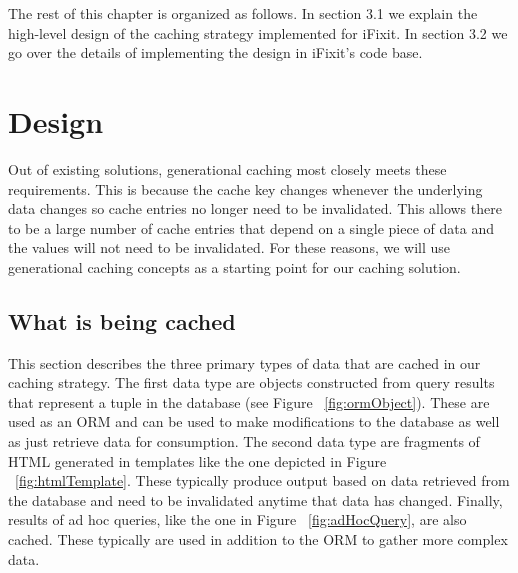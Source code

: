 \documentclass[12pt]{ucthesis}
\begin{document}
The rest of this chapter is organized as follows.
In section 3.1 we explain the high-level design of the caching strategy implemented for \textsf{iFixit}.
In section 3.2 we go over the details of implementing the design in \textsf{iFixit}'s code base.

\section{Design}
Out of existing solutions, generational caching most closely meets these requirements.
This is because the cache key changes whenever the underlying data changes so cache entries no longer need to be invalidated.
This allows there to be a large number of cache entries that depend on a single piece of data and the values will not need to be invalidated.
For these reasons, we will use generational caching concepts as a starting point for our caching solution.

\subsection{What is being cached}
This section describes the three primary types of data that are cached in our caching strategy.
The first data type are objects constructed from query results that represent a tuple in the database (see Figure ~\ref{fig:ormObject}).
These are used as an ORM and can be used to make modifications to the database as well as just retrieve data for consumption.
The second data type are fragments of HTML generated in templates like the one depicted in Figure ~\ref{fig:htmlTemplate}.
These typically produce output based on data retrieved from the database and need to be invalidated anytime that data has changed.
Finally, results of ad hoc queries, like the one in Figure ~\ref{fig:adHocQuery}, are also cached.
These typically are used in addition to the ORM to gather more complex data.
\end{document}
